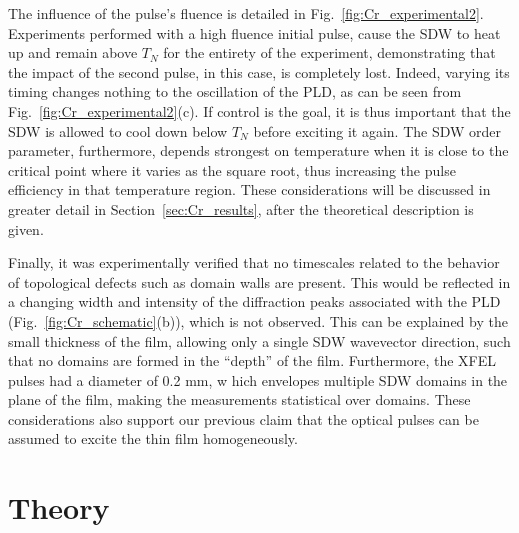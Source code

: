 The influence of the pulse's fluence is detailed in Fig.~\ref{fig:Cr_experimental2}.
Experiments performed with a high fluence initial pulse, cause the \gls{SDW} to heat up and remain above $T_N$ for the entirety of the experiment, demonstrating that the impact of the second pulse, in this case, is completely lost. Indeed, varying its timing changes nothing to the oscillation of the \gls{PLD}, as can be seen from Fig.~\ref{fig:Cr_experimental2}(c).
If control is the goal, it is thus important that the \gls{SDW} is allowed to cool down below $T_N$ before exciting it again.
The \gls{SDW} order parameter, furthermore, depends strongest on temperature when it is close to the critical point where it varies as the square root, thus increasing the pulse efficiency in that temperature region.
These considerations will be discussed in greater detail in Section~\ref{sec:Cr_results}, after the theoretical description is given.

Finally, it was experimentally verified that no timescales related to the behavior of topological defects such as domain walls are present. This would be reflected in a changing width and intensity of the diffraction peaks associated with the \gls{PLD} (Fig.~\ref{fig:Cr_schematic}(b)), which is not observed. This can be explained by the small thickness of the film, allowing only a single \gls{SDW} wavevector direction, such that no domains are formed in the ``depth'' of the film. Furthermore, the \gls{XFEL} pulses had a diameter of 0.2 mm, w hich envelopes multiple \gls{SDW} domains in the plane of the film\cite{Nicholson2016}, making the measurements statistical over domains.
These considerations also support our previous claim that the optical pulses can be assumed to excite the thin film homogeneously. 
\section{Theory \label{sec:Cr_model}}

